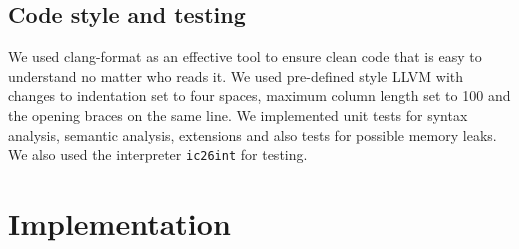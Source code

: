 \documentclass[a4paper]{article}
\begin{document}
\subsection{Code style and testing}
We used clang-format as an effective tool to ensure clean code that is easy to understand no matter who reads it.
We used pre-defined style LLVM with changes to indentation set to four spaces, maximum column length set to 100 and the opening braces on the same line.
We implemented unit tests for syntax analysis, semantic analysis, extensions and also tests for possible memory leaks.
We also used the interpreter \texttt{ic26int} for testing.

\section{Implementation}
\end{document}
